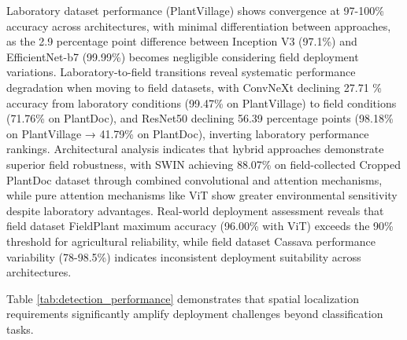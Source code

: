 \documentclass[sn-mathphys]{sn-jnl}
\theoremstyle{thmstyleone}%
\theoremstyle{thmstyletwo}%
\theoremstyle{thmstylethree}%
\begin{document}
Laboratory dataset performance (PlantVillage) shows convergence at 97-100\% accuracy across architectures, with minimal differentiation between approaches, as the 2.9 percentage point difference between Inception V3 (97.1\%) and EfficientNet-b7 (99.99\%) becomes negligible considering field deployment variations. Laboratory-to-field transitions reveal systematic performance degradation when moving to field datasets, with ConvNeXt declining 27.71 \% accuracy from laboratory conditions (99.47\% on PlantVillage) to field conditions (71.76\% on PlantDoc), and ResNet50 declining 56.39 percentage points (98.18\% on PlantVillage → 41.79\% on PlantDoc), inverting laboratory performance rankings. Architectural analysis indicates that hybrid approaches demonstrate superior field robustness, with SWIN achieving 88.07\% on field-collected Cropped PlantDoc dataset through combined convolutional and attention mechanisms, while pure attention mechanisms like ViT show greater environmental sensitivity despite laboratory advantages. Real-world deployment assessment reveals that field dataset FieldPlant maximum accuracy (96.00\% with ViT) exceeds the 90\% threshold for agricultural reliability, while field dataset Cassava performance variability (78-98.5\%) indicates inconsistent deployment suitability across architectures.


Table \ref{tab:detection_performance} demonstrates that spatial localization requirements significantly amplify deployment challenges beyond classification tasks. 
\end{document}
